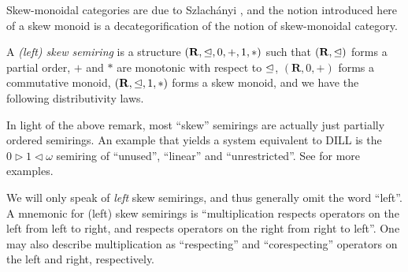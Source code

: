 \documentclass[submission,copyright,creativecommons]{eptcs}
\begin{document}
Skew-monoidal categories are due to Szlach\'anyi \cite{skew}, and the notion
introduced here of a skew monoid is a decategorification of the notion of
skew-monoidal category.

\begin{definition}
  A \emph{(left) skew semiring} is a structure
  $(\mathbf R, \trianglelefteq, 0, +, 1, *)$ such that $(\mathbf R, \trianglelefteq)$ forms a
  partial order, $+$ and $*$ are monotonic with respect to $\trianglelefteq$,
  $(\mathbf R, 0, +)$ forms a commutative monoid, $(\mathbf R, \trianglelefteq, 1, *)$
  forms a skew monoid, and we have the following distributivity laws.
\end{definition}

\begin{example}
  In light of the above remark, most ``skew'' semirings are actually
  just partially ordered semirings. An example that yields a system
  equivalent to DILL is the $0 \triangleright 1 \triangleleft \omega$
  semiring of ``unused'', ``linear'' and ``unrestricted''. See
  \cite{Granule18} for more examples.
\end{example}

We will only speak of \emph{left} skew semirings, and thus generally
omit the word ``left''.  A mnemonic for (left) skew semirings is
``multiplication respects operators on the left from left to right,
and respects operators on the right from right to left''.  One may
also describe multiplication as ``respecting'' and ``corespecting''
operators on the left and right, respectively.
\end{document}
